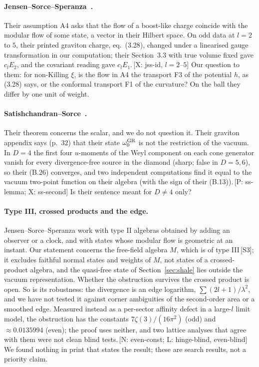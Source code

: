 \documentclass[11pt]{article}
\newcommand{\ev}[1]{\,{\textsf{\scriptsize[#1]}}}
\begin{document}
\paragraph{Jensen--Sorce--Speranza~\cite{JSS23}.} Their assumption A4 asks that the flow of a boost-like charge coincide with the modular flow of some state, a vector in their Hilbert space. On odd data at $l=2$ to $5$, their printed graviton charge, eq.~(3.28), changed under a linearised gauge transformation in our computation; their Section~3.3 with true volume fixed gave $c_lE_2$, and the covariant reading gave $c_lE_1$.\ev{X: jss-id, $l=2$--$5$} Our question to them: for non-Killing $\xi$, is the flow in A4 the transport F3 of the potential $h$, as (3.28) says, or the conformal transport F1 of the curvature? On the ball they differ by one unit of weight.

\paragraph{Satishchandran--Sorce~\cite{SS}.} Their theorem concerns the scalar, and we do not question it. Their graviton appendix says (p.~32) that their state $\omega_0^{\rm GR}$ is not the restriction of the vacuum. In $D=4$ the first four $u$-moments of the Weyl component on each cone generator vanish for every divergence-free source in the diamond (sharp; false in $D=5,6$), so their (B.26) converges, and two independent computations find it equal to the vacuum two-point function on their algebra (with the sign of their (B.13)).\ev{P: ss-lemma; X: ss-second} Is their sentence meant for $D\neq4$ only?

\paragraph{Type III, crossed products and the edge.} Jensen--Sorce--Speranza work with type II algebras obtained by adding an observer or a clock, and with states whose modular flow is geometric at an instant. Our statement concerns the free-field algebra $M$, which is of type III\ev{S3}; it excludes faithful normal states and weights of $M$, not states of a crossed-product algebra, and the quasi-free state of Section~\ref{sec:shale} lies outside the vacuum representation. Whether the obstruction survives the crossed product is open. So is its robustness: the divergence is an edge logarithm, $\sum(2l+1)/\lambda^2$, and we have not tested it against corner ambiguities of the second-order area or a smoothed edge. Measured instead as a per-sector affinity defect in a large-$l$ limit model, the obstruction has the constants $7\zeta(3)/(16\pi^2)$ (odd) and $\approx0.0135994$ (even); the proof uses neither, and two lattice analyses that agree with them were not clean blind tests.\ev{N: even-const; L: hinge-blind, even-blind} We found nothing in print that states the result; these are search results, not a priority claim.
\end{document}
